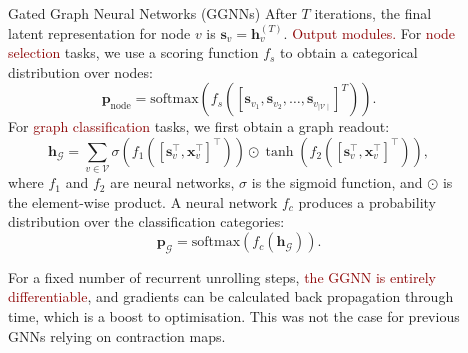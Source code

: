 \documentclass[final,hyperref={pdfpagelabels=false}]{beamer}
\newcommand{\shrink}{-15pt}
\begin{document}
\begin{frame}[t]
\begin{columns}[t]
\begin{column}{.3\textwidth}
\begin{block}{Gated Graph Neural Networks (GGNNs)}
    After $T$ iterations, the final latent representation for node $v$ is $\mathbf{s}_v = \mathbf{h}_v^{(T)}$.
    \textcolor{darkred}{Output modules.} For \textcolor{darkred}{node selection} tasks, we use a scoring function $f_s$ to obtain a categorical distribution over nodes:
        \begin{equation}
            \mathbf{p}_{\mathrm{node}} = \mathrm{softmax}\left(f_s([\mathbf{s}_{v_1}, \mathbf{s}_{v_2}, \ldots, \mathbf{s}_{v_{\mid \mathcal{V}\mid}}]^T)\right).
        \end{equation}
    For \textcolor{darkred}{graph classification} tasks, we first obtain a graph readout:
        \begin{equation}
            \mathbf{h}_{\mathcal{G}} =
                \sum_{v\in\mathcal{V}}  
                \sigma \left(f_1\left([\mathbf{s}_v^\top, \mathbf{x}_v^\top]^\top\right)\right)
                \odot
                \tanh \left(f_2\left([\mathbf{s}_v^\top, \mathbf{x}_v^\top]^\top\right)\right),
        \end{equation}
        where $f_1$ and $f_2$ are neural networks, $\sigma$ is the sigmoid function, and $\odot$ is the element-wise product. A neural network $f_c$ produces a probability distribution over the classification categories:
        \begin{equation}
            \mathbf{p}_{\mathcal{G}} = \mathrm{softmax}\left(f_c\left(\mathbf{h}_{\mathcal{G}}\right)\right).
        \end{equation}
    
    For a fixed number of recurrent unrolling steps, \textcolor{darkred}{the GGNN is entirely differentiable}, and gradients can be calculated back propagation through time, which is a boost to optimisation. This was not the case for previous GNNs relying on contraction maps.

    \end{block}
    
  \end{column} %


  \begin{column}{.02\textwidth}\end{column} %

  \begin{column}{.3\textwidth} %
    \vspace{\shrink}
    

\end{column}
\end{columns}
\end{frame}
\end{document}
